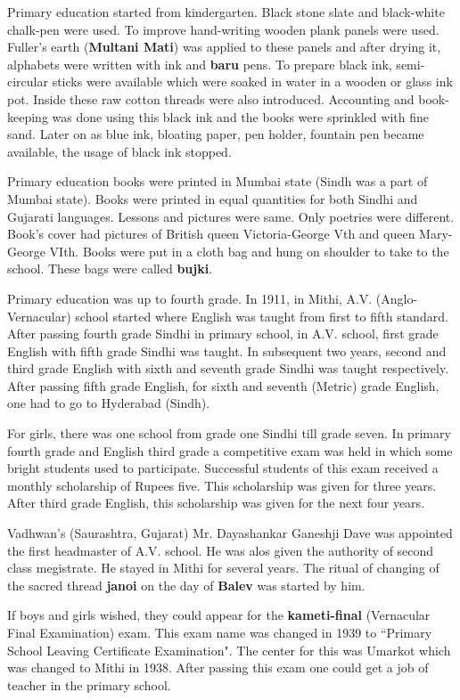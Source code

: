 Primary education started from kindergarten. Black stone slate and black-white
chalk-pen were used. To improve hand-writing wooden plank panels were used.
Fuller's earth (\textbf{Multani Mati}) was applied to these panels and after
drying it, alphabets were written with ink and \textbf{baru} pens. To prepare
black ink, semi-circular sticks were available which were soaked in water in a
wooden or glass ink pot. Inside these raw cotton threads were also introduced.
Accounting and book-keeping was done using this black ink and the books were
sprinkled with fine sand. Later on as blue ink, bloating paper, pen holder,
fountain pen became available, the usage of black ink stopped.

Primary education books were printed in Mumbai state (Sindh was a part of Mumbai
state). Books were printed in equal quantities for both Sindhi and Gujarati
languages. Lessons and pictures were same. Only poetries were different. Book's
cover had pictures of British queen Victoria-George Vth and queen Mary-George
VIth. Books were put in a cloth bag and hung on shoulder to take to the school.
These bags were called \textbf{bujki}.

Primary education was up to fourth grade. In 1911, in Mithi, A.V.
(Anglo-Vernacular) school started where English was taught from first to fifth
standard. After passing fourth grade Sindhi in primary school, in A.V. school,
first grade English with fifth grade Sindhi was taught. In subsequent two years,
second and third grade English with sixth and seventh grade Sindhi was taught
respectively. After passing fifth grade English, for sixth and seventh (Metric)
grade English, one had to go to Hyderabad (Sindh).

For girls, there was one school from grade one Sindhi till grade seven. In
primary fourth grade and English third grade a competitive exam was held in
which some bright students used to participate. Successful students of this exam
received a monthly scholarship of Rupees five. This scholarship was given for
three years. After third grade English, this scholarship was given for the next
four years.

Vadhwan's (Saurashtra, Gujarat) Mr. Dayashankar Ganeshji Dave was appointed the
first headmaster of A.V. school. He was alos given the authority of second class
megistrate. He stayed in Mithi for several years. The ritual of changing of the sacred thread
\textbf{janoi} on the day of \textbf{Balev} was started by him.

If boys and girls wished, they could appear for the \textbf{kameti-final}
(Vernacular Final Examination) exam. This exam name was changed in 1939 to
``Primary School Leaving Certificate Examination". The center for this was
Umarkot which was changed to Mithi in 1938. After passing this exam one could
get a job of teacher in the primary school.

